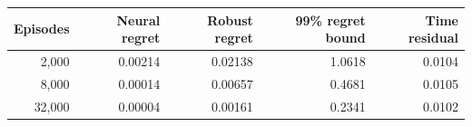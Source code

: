 \begin{tabular}{rrrrr}
\toprule
Episodes & Neural regret & Robust regret & 99\% regret bound & Time residual \\
\midrule
2,000 & 0.00214 & 0.02138 & 1.0618 & 0.0104 \\
8,000 & 0.00014 & 0.00657 & 0.4681 & 0.0105 \\
32,000 & 0.00004 & 0.00161 & 0.2341 & 0.0102 \\
\bottomrule
\end{tabular}
